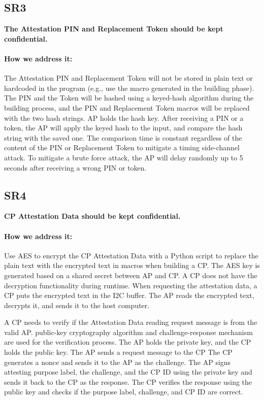 \documentclass[11pt,oneside,onecolumn,letterpaper]{article}
\newcounter{alg}
\begin{document}
	\subsection{SR3}
	\textbf{The Attestation PIN and Replacement Token should be kept confidential.}
	\paragraph{How we address it:}
	The Attestation PIN and Replacement Token will not be stored in plain text or hardcoded in the program (e.g., use the macro generated in the building phase).
	The PIN and the Token will be hashed using a keyed-hash algorithm during the building process,
	and the PIN and Replacement Token macros will be replaced with the two hash strings.
	AP holds the hash key.
	After receiving a PIN or a token,
	the AP will apply the keyed hash to the input,
	and compare the hash string with the saved one.
	The comparison time is constant regardless of the content of the PIN or Replacement Token to mitigate a timing side-channel attack.
	To mitigate a brute force attack,
	the AP will delay randomly up to 5 seconds after receiving a wrong PIN or token.
	
	\subsection{SR4}
	\textbf{CP Attestation Data should be kept confidential.}
	\paragraph{How we address it:}
	Use AES to encrypt the CP Attestation Data with a Python script to replace the plain text with the encrypted text in macros when building a CP.
	The AES key is generated based on a shared secret between AP and CP.
	A CP does not have the decryption functionality during runtime.
	When requesting the attestation data,
	a CP puts the encrypted text in the I2C buffer.
	The AP reads the encrypted text,
	decrypts it,
	and sends it to the host computer.
	
	A CP needs to verify if the Attestation Data reading request message is from the valid AP.
	public-key cryptography algorithm and challenge-response mechanism are used for the verification process.
	The AP holds the private key,
	and the CP holds the public key.
	The AP sends a request message to the CP
	The CP generates a nonce and sends it to the AP as the challenge.
	The AP signs attesting purpose label,
	the challenge,
	and the CP ID using the private key and sends it back to the CP as the response.
	The CP verifies the response using the public key and checks if the purpose label,
	challenge,
	and CP ID are correct.
	
\end{document}
